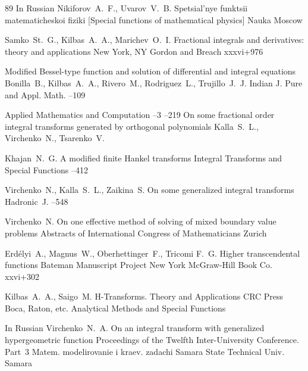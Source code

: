\begin{thebibliography}{89}
\lang In Russian
\by  Nikiforov~A.~F., Uvarov~V.~B.
\book Spetsial'nye funktsii matematicheskoi fiziki \rm  [Special functions of mathematical physics] 
\publ Nauka
\publaddr Moscow

\by Samko~St.~G., Kilbas~A.~A., Marichev~O.~I.
\book Fractional integrals and derivatives: theory and applications
\publaddr New York, NY
\publ Gordon and Breach
\totalpages xxxvi+976 



\paper Modified Bessel-type function and solution of differential and integral equations
\by Bonilla~B., Kilbas~A.~A., Rivero~M., Rodriguez~L., Trujillo~J.~J.
\jour Indian J. Pure and Appl. Math.
--109

\jour Applied Mathematics and Computation
–3
–219
\paper On some fractional order integral transforms generated by orthogonal polynomials
\by Kalla~S.~L.,     Virchenko~N.,   Tsarenko~V.

\by Khajan~N.~G.
\paper A modified finite Hankel  transforms 
\jour Integral Transforms and Special Functions
--412


\by Virchenko~N., Kalla~S.~L., Zaikina~S.
\paper On some generalized integral transforms
\jour Hadronic~J. 
--548 


\by Virchenko~N. 
\paper On one effective method of solving of mixed boundary value problems 
\inbook Abstracts  of International Congress of Mathematicians
\publaddr Zurich

\by Erd\'elyi~A., Magnus~W., Oberhettinger~F., Tricomi F.~G.
\book Higher transcendental functions
\serial Bateman Manuscript Project
\publaddr New York
\publ McGraw-Hill Book Co.
\totalpages xxvi+302 

\by Kilbas~A.~A., Saigo~M.
\book H-Transforms. Theory and Applications
\publ CRC Press 
\publaddr Boca, Raton, etc.
\serial  Analytical Methods and Special Functions 

\lang In Russian
\by Virchenko~N.~A.
\paper On an integral transform with generalized hypergeometric function 
\inbook Proceedings of the Twelfth Inter-University Conference. Part~3
\serial Matem. modelirovanie i kraev. zadachi 
\publ Samara State Technical Univ.
\publaddr Samara


\end{thebibliography}


\EngDate	

\newpage

\Russian

%
%

